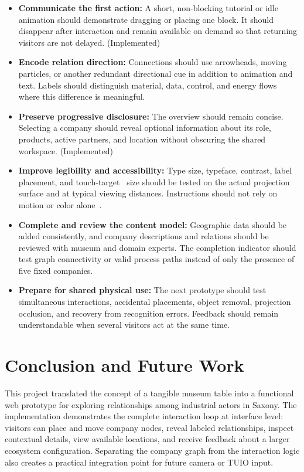 \documentclass[sigconf,nonacm]{acmart}
\begin{document}
\begin{itemize}
  \item \textbf{Communicate the first action:} A short, non-blocking tutorial or idle animation should demonstrate dragging or placing one block. It should disappear after interaction and remain available on demand so that returning visitors are not delayed. (Implemented)
  \item \textbf{Encode relation direction:} Connections should use arrowheads, moving particles, or another redundant directional cue in addition to animation and text. Labels should distinguish material, data, control, and energy flows where this difference is meaningful.
  \item \textbf{Preserve progressive disclosure:} The overview should remain concise. Selecting a company should reveal optional information about its role, products, active partners, and location without obscuring the shared workspace. (Implemented)
  \item \textbf{Improve legibility and accessibility:} Type size, typeface, contrast, label placement, and touch-target~\cite{wcag22} size should be tested on the actual projection surface and at typical viewing distances. Instructions should not rely on motion or color alone~\cite{wcag21}.
  \item \textbf{Complete and review the content model:} Geographic data should be added consistently, and company descriptions and relations should be reviewed with museum and domain experts. The completion indicator should test graph connectivity or valid process paths instead of only the presence of five fixed companies.
  \item \textbf{Prepare for shared physical use:} The next prototype should test simultaneous interactions, accidental placements, object removal, projection occlusion, and recovery from recognition errors. Feedback should remain understandable when several visitors act at the same time.
\end{itemize}

\section{Conclusion and Future Work}

This project translated the concept of a tangible museum table into a functional web prototype for exploring relationships among industrial actors in Saxony. The implementation demonstrates the complete interaction loop at interface level: visitors can place and move company nodes, reveal labeled relationships, inspect contextual details, view available locations, and receive feedback about a larger ecosystem configuration. Separating the company graph from the interaction logic also creates a practical integration point for future camera or TUIO input.
\end{document}
